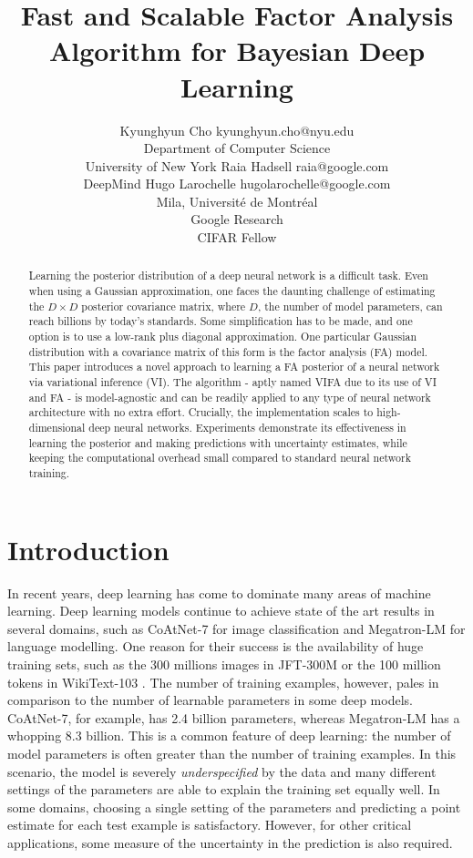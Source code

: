 \documentclass[10pt]{article} %
\title{Fast and Scalable Factor Analysis Algorithm for Bayesian Deep Learning}
\author{\name Kyunghyun Cho \email kyunghyun.cho@nyu.edu \\
      \addr Department of Computer Science\\
      University of New York
      \AND
      \name Raia Hadsell \email raia@google.com \\
      \addr DeepMind
      \AND
      \name Hugo Larochelle \email hugolarochelle@google.com\\
      \addr Mila, Universit\'e de Montr\'eal \\
      Google Research\\
      CIFAR Fellow}
\begin{document}
\maketitle


\begin{abstract}
Learning the posterior distribution of a deep neural network is a difficult task. Even when using a Gaussian approximation, one faces the daunting challenge of estimating the $D \times D$ posterior covariance matrix, where $D$, the number of model parameters, can reach billions by today's standards. Some simplification has to be made, and one option is to use a low-rank plus diagonal approximation. One particular Gaussian distribution with a covariance matrix of this form is the factor analysis (FA) model. This paper introduces a novel approach to learning a FA posterior of a neural network via variational inference (VI). The algorithm -  aptly named VIFA due to its use of VI and FA - is model-agnostic and can be readily applied to any type of neural network architecture with no extra effort. Crucially, the implementation scales to high-dimensional deep neural networks. Experiments demonstrate its effectiveness in learning the posterior and making predictions with uncertainty estimates, while keeping the computational overhead small compared to standard neural network training. 
\end{abstract}

\section{Introduction}

In recent years, deep learning \citep{goodfellow2016deep} has come to dominate many areas of machine learning. Deep learning models continue to achieve state of the art results in several domains, such as CoAtNet-7 \citep{dai2021} for image classification and Megatron-LM \citep{shoeybi2019} for language modelling. One reason for their success is the availability of huge training sets, such as the 300 millions images in JFT-300M \citep{sun2017} or the 100 million tokens in WikiText-103 \citep{merity2016}. The number of training examples, however, pales in comparison to the number of learnable parameters in some deep models. CoAtNet-7, for example, has 2.4 billion parameters, whereas Megatron-LM has a whopping 8.3 billion. This is a common feature of deep learning: the number of model parameters is often greater than the number of training examples. In this scenario, the model is severely \emph{underspecified} by the data and many different settings of the parameters are able to explain the training set equally well. In some domains, choosing a single setting of the parameters and predicting a point estimate for each test example is satisfactory. However, for other critical applications, some measure of the uncertainty in the prediction is also required. 
\end{document}
